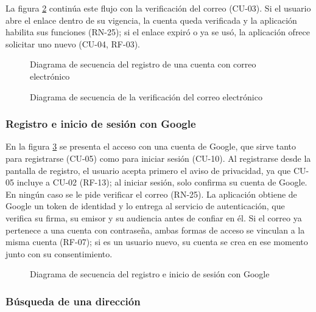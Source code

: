 La figura \ref{fig:sd_verificacion} continúa este flujo con la verificación del correo (CU-03). Si el usuario abre el enlace dentro de su vigencia, la cuenta queda verificada y la aplicación habilita sus funciones (RN-25); si el enlace expiró o ya se usó, la aplicación ofrece solicitar uno nuevo (CU-04, RF-03).

\begin{figure}[htbp]
    \centering
    
    \caption{Diagrama de secuencia del registro de una cuenta con correo electrónico}
    \label{fig:sd_registro}
\end{figure}

\begin{figure}[htbp]
    \centering
    
    \caption{Diagrama de secuencia de la verificación del correo electrónico}
    \label{fig:sd_verificacion}
\end{figure}

\subsubsection{Registro e inicio de sesión con Google}

En la figura \ref{fig:sd_google} se presenta el acceso con una cuenta de Google, que sirve tanto para registrarse (CU-05) como para iniciar sesión (CU-10). Al registrarse desde la pantalla de registro, el usuario acepta primero el aviso de privacidad, ya que CU-05 incluye a CU-02 (RF-13); al iniciar sesión, solo confirma su cuenta de Google. En ningún caso se le pide verificar el correo (RN-25). La aplicación obtiene de Google un token de identidad y lo entrega al servicio de autenticación, que verifica su firma, su emisor y su audiencia antes de confiar en él. Si el correo ya pertenece a una cuenta con contraseña, ambas formas de acceso se vinculan a la misma cuenta (RF-07); si es un usuario nuevo, su cuenta se crea en ese momento junto con su consentimiento.

\begin{figure}[htbp]
    \centering
    
    \caption{Diagrama de secuencia del registro e inicio de sesión con Google}
    \label{fig:sd_google}
\end{figure}

\subsubsection{Búsqueda de una dirección}

